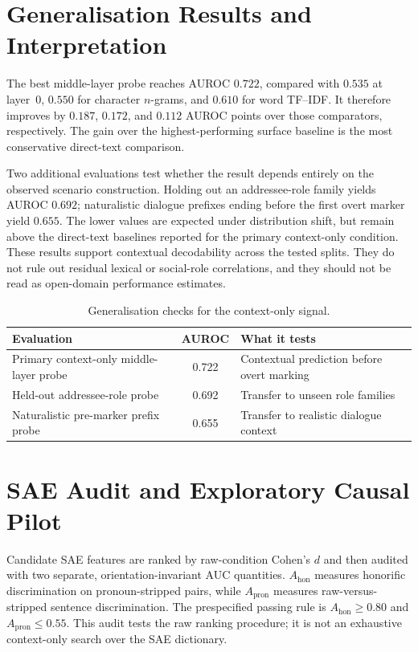 \documentclass[10pt]{article}
\begin{document}
\FloatBarrier
\section{Generalisation Results and Interpretation}

The best middle-layer probe reaches AUROC $0.722$, compared with $0.535$ at
layer~0, $0.550$ for character $n$-grams, and $0.610$ for word TF--IDF. It
therefore improves by $0.187$, $0.172$, and $0.112$ AUROC points over those
comparators, respectively. The gain over the highest-performing surface
baseline is the most conservative direct-text comparison.

Two additional evaluations test whether the result depends entirely on the
observed scenario construction. Holding out an addressee-role family yields
AUROC $0.692$; naturalistic dialogue prefixes ending before the first overt
marker yield $0.655$. The lower values are expected under distribution shift,
but remain above the direct-text baselines reported for the primary context-only
condition. These results support contextual decodability across the tested
splits. They do not rule out residual lexical or social-role correlations, and
they should not be read as open-domain performance estimates.

\begin{table}[H]
\centering
\small
\setlength\tabcolsep{5pt}
\renewcommand{\arraystretch}{1.10}
\begin{tabularx}{\textwidth}{>{\raggedright\arraybackslash}X c >{\raggedright\arraybackslash}X}
\toprule
\textbf{Evaluation} & \textbf{AUROC} & \textbf{What it tests} \\
\midrule
Primary context-only middle-layer probe & 0.722 & Contextual prediction before overt marking \\
Held-out addressee-role probe & 0.692 & Transfer to unseen role families \\
Naturalistic pre-marker prefix probe & 0.655 & Transfer to realistic dialogue context \\
\bottomrule
\end{tabularx}
\caption{Generalisation checks for the context-only signal.}
\label{tab:generalisation}
\end{table}

\FloatBarrier
\section{SAE Audit and Exploratory Causal Pilot}

Candidate SAE features are ranked by raw-condition Cohen's $d$ and then audited
with two separate, orientation-invariant AUC quantities. $A_{\mathrm{hon}}$
measures honorific discrimination on pronoun-stripped pairs, while
$A_{\mathrm{pron}}$ measures raw-versus-stripped sentence discrimination. The
prespecified passing rule is $A_{\mathrm{hon}}\geq0.80$ and
$A_{\mathrm{pron}}\leq0.55$. This audit tests the raw ranking procedure; it is
not an exhaustive context-only search over the SAE dictionary.
\end{document}
